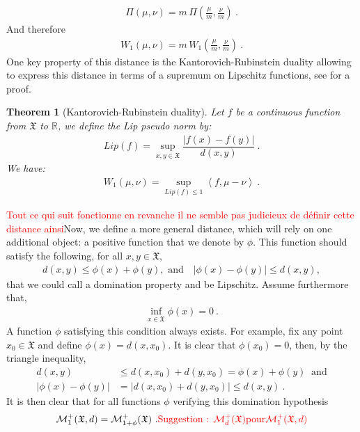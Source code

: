 \documentclass[11pt,a4paper]{article}
\newcommand{\RR}{\mathbb{R}}
\newcommand{\MC}{\mathcal{M}}
\newcommand{\XF}{\mathfrak{X}}
\newcommand{\red}[1]{\textcolor{red}{#1}}
\newcommand{\brac}[1]{\left\langle#1\right\rangle}
\newtheorem{theorem}{Theorem}[section]
\begin{document}
\begin{align*}
    \Pi(\mu,\nu) = m \, \Pi\left(\frac{\mu}{m}, \frac{\nu}{m}\right)\ .
\end{align*}
And therefore
\begin{align*}
    W_1(\mu,\nu) = m\, W_1\left( \frac{\mu}{m}, \frac{\nu}{m}\right)\ .
\end{align*}
One key property of this distance is the Kantorovich-Rubinstein duality allowing to express this distance in terms of a supremum on Lipschitz functions, see \cite{santambrogio2015optimal} for a proof.
\begin{theorem}[Kantorovich-Rubinstein duality]
    Let $f$ be a continuous function from $\XF$ to $\RR$, we define the Lip pseudo norm by:
    \begin{align*}
        Lip(f) = \sup\limits_{x,y \in \XF} \dfrac{\left|f(x) - f(y) \right|}{d(x,y)} \ .
    \end{align*}
    We have:
    \begin{align*}
        W_1(\mu,\nu) = \sup\limits_{Lip(f) \leq 1} \brac{f,\mu - \nu}\ .
    \end{align*}
\end{theorem}
\red{Tout ce qui suit fonctionne en revanche il ne semble pas judicieux de définir cette distance ainsi}Now, we define a more general distance, which will rely on one additional object: a positive function that we denote by $\phi$. This function should satisfy the following, for all $x,y \in \XF$,
\begin{align*}
    d(x,y) \leq \phi(x) + \phi(y), \text{ and}\quad|\phi(x) - \phi(y)| \leq d(x,y),
\end{align*}
that we could call a domination property and be Lipschitz. Assume furthermore that,
\begin{align*}
    \inf\limits_{x \in \XF} \phi(x) = 0\ .
\end{align*}
A function $\phi$ satisfying this condition always exists. For example, fix any point $x_0 \in \XF$ and define $\phi(x) = d(x,x_0)$. It is clear that $\phi(x_0) = 0$, then, by the triangle inequality,
\begin{align*}
d(x,y) &\leq d(x,x_0) + d(y,x_0) = \phi(x) + \phi(y)\ \text{ and}\\
|\phi(x) - \phi(y)| &= |d(x,x_0) + d(y,x_0)| \leq d(x,y)\ .
\end{align*}
It is then clear that for all functions $\phi$ verifying this domination hypothesis
\[
\MC^+_1(\XF,d) = \MC^+_{1 + \phi}(\XF)\ . \red{\text{Suggestion : } \MC^+_d(\XF) \text{pour} \MC^+_1(\XF,d)}
\]
\end{document}
